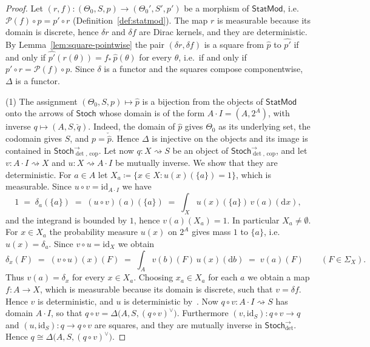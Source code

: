 \documentclass[11pt,a4paper]{article}
\theoremstyle{plain}
\theoremstyle{definition}
\theoremstyle{remark}
\newcommand{\cat}[1]{\mathsf{#1}}
\newcommand{\Stoch}{\cat{Stoch}}
\newcommand{\Prb}{\mathcal{P}}
\newcommand{\id}{\mathrm{id}}
\newcommand{\del}{\delta}
\newcommand{\StatMod}{\cat{StatMod}}
\newcommand{\Jc}{\Delta}
\newcommand{\Arrdet}[1]{#1^{\rightarrow}_{\det}}
\newcommand{\Arrcop}[1]{#1^{\rightarrow}_{\det,\,\mathrm{cop}}}
\begin{document}
\begin{proof}
Let $(r,f) \colon (\Theta_0,S,p) \to (\Theta_0',S',p')$ be a morphism of
$\StatMod$, i.e.\ $\Prb(f) \circ p = p' \circ r$
(Definition~\ref{def:statmod}). The map $r$ is measurable because its domain is
discrete, hence $\del r$ and $\del f$ are Dirac kernels, and they are
deterministic. By Lemma~\ref{lem:square-pointwise} the pair
$(\del r,\del f)$ is a square from $\widehat p$ to $\widehat{p'}$ if and only
if $\widehat{p'}(r(\theta)) = f_{*}\,\widehat p(\theta)$ for every $\theta$,
i.e.\ if and only if $p' \circ r = \Prb(f) \circ p$. Since $\del$ is a functor
and the squares compose componentwise, $\Jc$ is a functor.

(1) The assignment $(\Theta_0,S,p) \mapsto \widehat p$ is a bijection from the
objects of $\StatMod$ onto the arrows of $\Stoch$ whose domain is of the form
$A \cdot I = (A,2^{A})$, with inverse $q \mapsto (A,S,\check q)$. Indeed, the
domain of $\widehat p$ gives $\Theta_0$ as its underlying set, the codomain
gives $S$, and $p = \check{\widehat p}$. Hence $\Jc$ is injective on the
objects and its image is contained in $\Arrcop{\Stoch}$. Let now
$q \colon X \rightsquigarrow S$ be an object of $\Arrcop{\Stoch}$, and let
$v \colon A \cdot I \rightsquigarrow X$ and
$u \colon X \rightsquigarrow A \cdot I$ be mutually inverse. We show that they
are deterministic. For $a \in A$ let
$X_a \coloneqq \{x \in X : u(x)(\{a\}) = 1\}$, which is measurable. Since
$u \circ v = \id_{A \cdot I}$ we have
\[
1 \;=\; \delta_a(\{a\}) \;=\; (u \circ v)(a)(\{a\})
\;=\; \int_X u(x)(\{a\})\, v(a)(\mathrm{d}x),
\]
and the integrand is bounded by $1$, hence $v(a)(X_a) = 1$. In particular
$X_a \neq \emptyset$. For $x \in X_a$ the probability measure $u(x)$ on $2^{A}$
gives mass $1$ to $\{a\}$, i.e.\ $u(x) = \delta_a$. Since $v \circ u = \id_X$
we obtain
\[
\delta_x(F) \;=\; (v \circ u)(x)(F)
\;=\; \int_A v(b)(F)\, u(x)(\mathrm{d}b) \;=\; v(a)(F)
\qquad (F \in \Sigma_X).
\]
Thus $v(a) = \delta_x$ for every $x \in X_a$. Choosing $x_a \in X_a$ for each
$a$ we obtain a map $f \colon A \to X$, which is measurable because its domain
is discrete, such that $v = \del f$. Hence $v$ is deterministic, and $u$ is
deterministic by~\cite[Lem.~10.9(c)]{fritz_synthetic_2020}. Now
$q \circ v \colon A \cdot I \rightsquigarrow S$ has domain $A \cdot I$, so that
$q \circ v = \Jc\bigl(A, S, (q \circ v)^{\vee}\bigr)$. Furthermore
$(v, \id_S) \colon q \circ v \to q$ and $(u, \id_S) \colon q \to q \circ v$ are
squares, and they are mutually inverse in $\Arrdet{\Stoch}$. Hence
$q \cong \Jc\bigl(A,S,(q \circ v)^{\vee}\bigr)$.


\end{proof}
\end{document}
